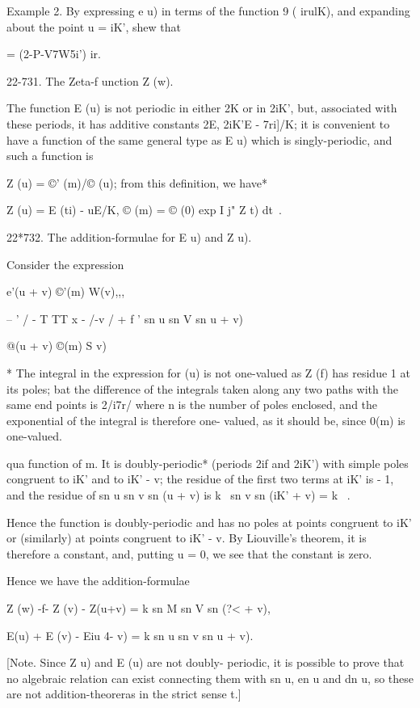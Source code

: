 Example 2. By expressing e u) in terms of the function 9 ( irulK), and
expanding about the point u = iK', shew that

 = (2-P-V7W5i') ir.

22-731. The Zeta-f unction Z (w).

The function E (u) is not periodic in either 2K or in 2iK', but,
associated with these periods, it has additive constants 2E, 2iK'E -
7ri]/K; it is convenient to have a function of the same general type
as E u) which is singly-periodic, and such a function is

Z (u) = ©' (m)/© (u); from this definition, we have*

Z (u) = E (ti) - uE/K, © (m) = © (0) exp I j" Z t) dt\ .

22*732. The addition-formulae for E u) and Z u).

Consider the expression

e'(u + v) ©'(m) W(v),,,

-- ' / - T TT x - /-v / + f ' sn u sn V sn u + v)

@(u + v) ©(m) S v)

* The integral in the expression for (u) is not one-valued as Z (f)
has residue 1 at its poles; bat the difference of the integrals taken
along any two paths with the same end points is 2/i7r/ where n is the
number of poles enclosed, and the exponential of the integral is
therefore one- valued, as it should be, since 0(m) is one-valued.

%
%

qua function of m. It is doubly-periodic* (periods 2if and 2iK') with
simple poles congruent to iK' and to iK' - v; the residue of the
first two terms at iK' is - 1, and the residue of sn u sn v sn (u + v)
is k~ sn v sn (iK' + v) = k~ .

Hence the function is doubly-periodic and has no poles at points
congruent to iK' or (similarly) at points congruent to iK' - v. By
Liouville's theorem, it is therefore a constant, and, putting u = 0,
we see that the constant is zero.

Hence we have the addition-formulae

Z (w) -f- Z (v) - Z(u+v) = k sn M sn V sn (?< + v),

E(u) + E (v) - Eiu 4- v) = k sn u sn v sn u + v).

[Note. Since Z u) and E (u) are not doubly- periodic, it is possible
to prove that no algebraic relation can exist connecting them with sn
u, en u and dn u, so these are not addition-theoreras in the strict
sense t.]

